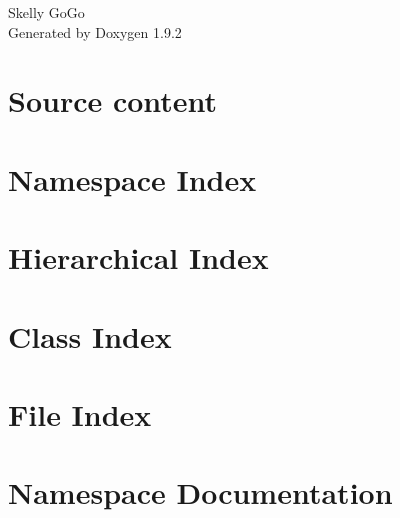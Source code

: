 \documentclass[twoside]{book}
\newcommand{\+}{\discretionary{\mbox{\scriptsize$\hookleftarrow$}}{}{}}
\newcommand{\clearemptydoublepage}{%
    \newpage{\pagestyle{empty}\cleardoublepage}%
  }
\begin{document}
  \raggedbottom
  \begin{titlepage}
  \vspace*{7cm}
  \begin{center}%
  {\Large Skelly Go\+Go}\\
  \vspace*{1cm}
  {\large Generated by Doxygen 1.9.2}\\
  \end{center}
  \end{titlepage}
  \clearemptydoublepage
  \tableofcontents
  \clearemptydoublepage
\chapter{Source content}
\label{md_src_readme}

\chapter{Namespace Index}

\chapter{Hierarchical Index}

\chapter{Class Index}

\chapter{File Index}

\chapter{Namespace Documentation}





\end{document}
